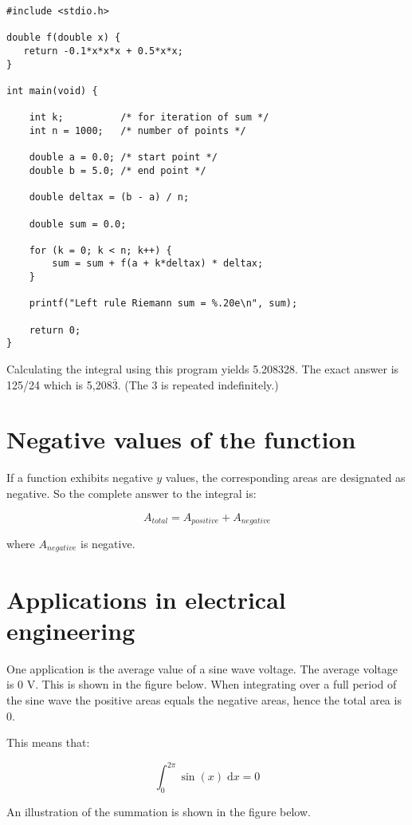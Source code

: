 \documentclass[12pt]{article}
\begin{document}
\begin{lstlisting}
#include <stdio.h>

double f(double x) {
   return -0.1*x*x*x + 0.5*x*x;
}

int main(void) {

    int k;          /* for iteration of sum */
    int n = 1000;   /* number of points */
   
    double a = 0.0; /* start point */
    double b = 5.0; /* end point */

    double deltax = (b - a) / n;

    double sum = 0.0;

    for (k = 0; k < n; k++) {
        sum = sum + f(a + k*deltax) * deltax;
    }

    printf("Left rule Riemann sum = %.20e\n", sum);

    return 0;
}
\end{lstlisting}

Calculating the integral using this program yields 5.208328. The exact answer is 125/24 which is 5,208$\overline{3}$. (The 3 is repeated indefinitely.)

\section{Negative values of the function}
If a function exhibits negative $y$ values, the corresponding areas are designated as negative. So the complete answer to the integral is:

\begin{equation}
A_{total} = A_{positive} + A_{negative}
\end{equation}

where $A_{negative}$ is negative.


\section{Applications in electrical engineering}
One application is the average value of a sine wave voltage. The average voltage is 0 V. This is shown in the figure below. When integrating over a full period of the sine wave the positive areas equals the negative areas, hence the total area is 0.

This means that:

\begin{equation}
\int_0^{2\pi} \sin(x)\;\mathrm{d}x = 0
\end{equation}

An illustration of the summation is shown in the figure below.
\end{document}
